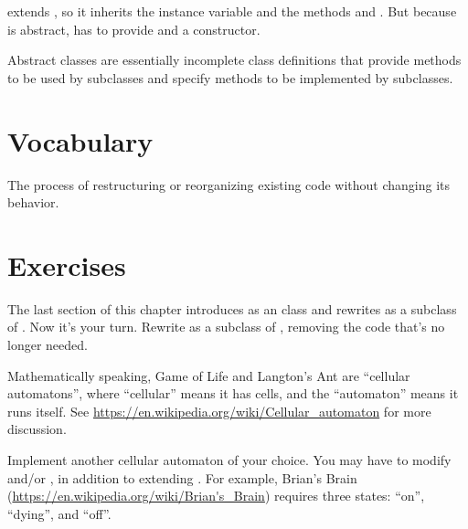  extends , so it inherits the instance variable  and the methods  and .
But because  is abstract,  has to provide  and a constructor.

Abstract classes are essentially incomplete class definitions that provide methods to be used by subclasses and specify methods to be implemented by subclasses.


\section{Vocabulary}


\begin{description}

The process of restructuring or reorganizing existing code without changing its behavior.

\end{description}


\section{Exercises}

\begin{exercise}

The last section of this chapter introduces  as an  class and rewrites  as a subclass of .
Now it's your turn.
Rewrite  as a subclass of , removing the code that's no longer needed.

\end{exercise}


\begin{exercise}

Mathematically speaking, Game of Life and Langton's Ant are ``cellular automatons'', where
``cellular'' means it has cells, and the ``automaton'' means it runs itself.
See \url{https://en.wikipedia.org/wiki/Cellular_automaton} for more discussion.

Implement another cellular automaton of your choice.
You may have to modify  and/or , in addition to extending .
For example, Brian's Brain (\url{https://en.wikipedia.org/wiki/Brian's_Brain}) requires three states: ``on'', ``dying'', and ``off''.

\end{exercise}
